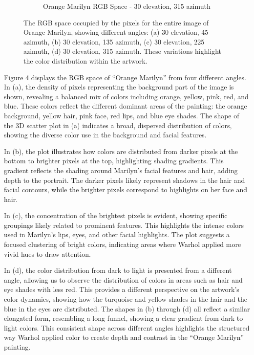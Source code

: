 \documentclass{article}
\begin{document}
\begin{figure}[ht]
\begin{subfigure}{0.45\textwidth}
    \caption{Orange Marilyn RGB Space - 30 \degree elevation, 315 \degree azimuth}
    \label{fig:4_4_orange_marilyn_original_scatter}
  \end{subfigure}
  \caption{The RGB space occupied by the pixels for the entire image of Orange Marilyn, showing different angles: (a) 30 \degree elevation, 45 \degree azimuth, (b) 30 \degree elevation, 135 \degree azimuth, (c) 30 \degree elevation, 225 \degree azimuth, (d) 30 \degree elevation, 315 \degree azimuth. These variations highlight the color distribution within the artwork.}
  \label{fig:orange_marilyn_original_scatter_2}
\end{figure}

Figure 4 displays the RGB space of ``Orange Marilyn'' from four
different angles. In (a), the density of pixels representing the
background part of the image is shown, revealing a balanced mix of
colors including orange, yellow, pink, red, and blue. These colors
reflect the different dominant areas of the painting: the orange
background, yellow hair, pink face, red lips, and blue eye shades. The
shape of the 3D scatter plot in (a) indicates a broad, dispersed
distribution of colors, showing the diverse color use in the background
and facial features.

In (b), the plot illustrates how colors are distributed from darker
pixels at the bottom to brighter pixels at the top, highlighting shading
gradients. This gradient reflects the shading around Marilyn's facial
features and hair, adding depth to the portrait. The darker pixels
likely represent shadows in the hair and facial contours, while the
brighter pixels correspond to highlights on her face and hair.

In (c), the concentration of the brightest pixels is evident, showing
specific groupings likely related to prominent features. This highlights
the intense colors used in Marilyn's lips, eyes, and other facial
highlights. The plot suggests a focused clustering of bright colors,
indicating areas where Warhol applied more vivid hues to draw attention.

In (d), the color distribution from dark to light is presented from a
different angle, allowing us to observe the distribution of colors in
areas such as hair and eye shades with less red. This provides a
different perspective on the artwork's color dynamics, showing how the
turquoise and yellow shades in the hair and the blue in the eyes are
distributed. The shapes in (b) through (d) all reflect a similar
elongated form, resembling a long funnel, showing a clear gradient from
dark to light colors. This consistent shape across different angles
highlights the structured way Warhol applied color to create depth and
contrast in the ``Orange Marilyn'' painting.
\end{document}
